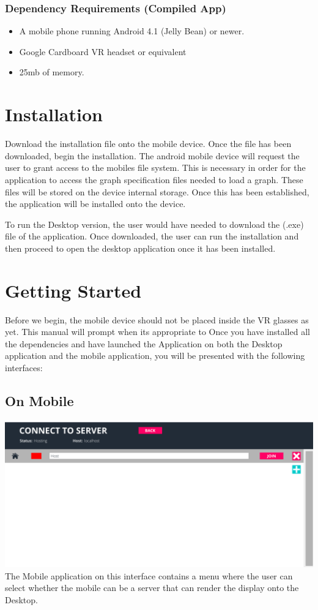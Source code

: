 \documentclass[english]{article}
\begin{document}
\subsubsection{Dependency Requirements (Compiled App)}

\begin{itemize}
   \item A mobile phone running Android 4.1 (Jelly Bean) or newer.
   \item Google Cardboard VR headset or equivalent
   \item 25mb of memory. 
\end{itemize} 


\section{Installation}
Download the installation file onto the mobile device. Once the file has been downloaded, begin the installation. The android mobile device will request the user to grant access to the mobiles file system. This is necessary in order for the application to access the graph specification files needed to load a graph. These files will be stored on the device internal storage. Once this has been established, the application will be installed onto the device. 

To run the Desktop version, the user would have needed to download the (.exe) file of the application. Once downloaded, the user can run the installation and then proceed to open the desktop application once it has been installed. 
 
\section{Getting Started}
Before we begin, the mobile device should not be placed inside the VR glasses as yet. This manual will prompt when its appropriate to 
Once you have installed all the dependencies and have launched the Application on both the Desktop application and the mobile application, you will be presented with the following interfaces:
\subsection{On Mobile}
\includegraphics[scale=0.4]{mobileScreen.png}
The Mobile application on this interface contains a menu where the user can select whether the mobile can be a server that can render the display onto the Desktop. 
\end{document}
